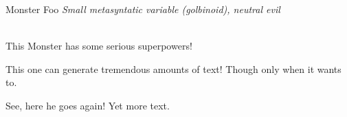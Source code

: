 \documentclass[10pt,twoside,twocolumn]{article}
\begin{document}
\begin{monsterbox}{Monster Foo}
	\textit{Small metasyntatic variable (golbinoid), neutral evil}\\
	\hline
	\basics[%
	armorclass = 12,
	hitpoints  = 16 (3d8 + 3),
	speed      = 50 ft
	]
	\hline
	\stats[
    STR = \stat{12}, %
    DEX = \stat{7}
	]
	\hline
	\details[%
	languages = {Common Lisp, Erlang},
	]
	\hline \\[1mm]
	\begin{monsteraction}
		This Monster has some serious superpowers!
	\end{monsteraction}
	\begin{monsteraction}
		This one can generate tremendous amounts of text! Though only when it wants to.
	\end{monsteraction}

	\begin{monsteraction}
    See, here he goes again! Yet more text.
	\end{monsteraction}
\end{monsterbox}

\end{document}
